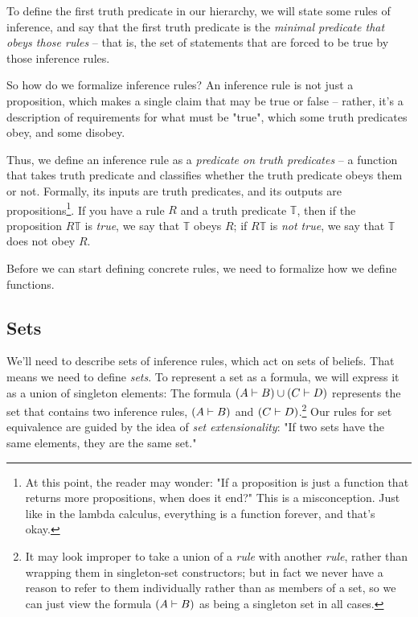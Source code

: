 \documentclass{article}
\begin{document}
  To define the first truth predicate in our hierarchy, we will state some rules of inference, and say that the first truth predicate is the \emph{minimal predicate that obeys those rules} – that is, the set of statements that are forced to be true by those inference rules.
  
  So how do we formalize inference rules? An inference rule is not just a proposition, which makes a single claim that may be true or false – rather, it's a description of requirements for what must be "true", which some truth predicates obey, and some disobey.
    
  Thus, we define an inference rule as a \emph{predicate on truth predicates} – a function that takes truth predicate and classifies whether the truth predicate obeys them or not. Formally, its inputs are truth predicates, and its outputs are propositions\footnote{At this point, the reader may wonder: "If a proposition is just a function that returns more propositions, when does it end?" This is a misconception. Just like in the lambda calculus, everything is a function forever, and that's okay.}. If you have a rule $R$ and a truth predicate $\mathbb{T}$, then if the proposition $R \mathbb{T}$ is \emph{true}, we say that $\mathbb{T}$ obeys $R$; if $R \mathbb{T}$ is \emph{not true}, we say that $\mathbb{T}$ does not obey $R$.
  
  Before we can start defining concrete rules, we need to formalize how we define functions.
  
  \fi
  
  \subsection{Sets}
  
  We'll need to describe sets of inference rules, which act on sets of beliefs. That means we need to define \emph{sets}. To represent a set as a formula, we will express it as a union of singleton elements: The formula $(A \vdash B) \cup (C \vdash D)$ represents the set that contains two inference rules, $(A \vdash B)$ and $(C \vdash D)$.\footnote{It may look improper to take a union of a \emph{rule} with another \emph{rule}, rather than wrapping them in singleton-set constructors; but in fact we never have a reason to refer to them individually rather than as members of a set, so we can just view the formula $(A \vdash B)$ as being a singleton set in all cases.} Our rules for set equivalence are guided by the idea of \emph{set extensionality}: "If two sets have the same elements, they are the same set."
  
\end{document}
